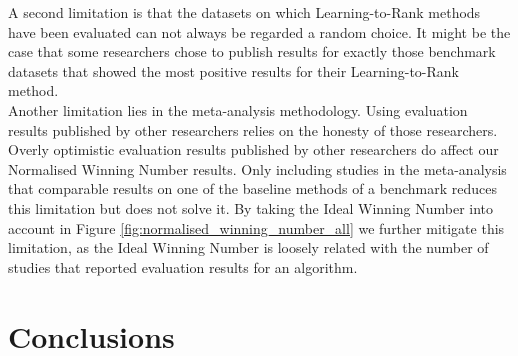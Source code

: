 A second limitation is that the datasets on which Learning-to-Rank methods have been evaluated can not always be regarded a random choice. It might be the case that some researchers chose to publish results for exactly those benchmark datasets that showed the most positive results for their Learning-to-Rank method.\\

Another limitation lies in the meta-analysis methodology. Using evaluation results published by other researchers relies on the honesty of those researchers. Overly optimistic evaluation results published by other researchers do affect our Normalised Winning Number results. Only including studies in the meta-analysis that comparable results on one of the baseline methods of a benchmark reduces this limitation but does not solve it. By taking the Ideal Winning Number into account in Figure \ref{fig:normalised_winning_number_all} we further mitigate this limitation, as the Ideal Winning Number is loosely related with the number of studies that reported evaluation results for an algorithm.

\section{Conclusions}